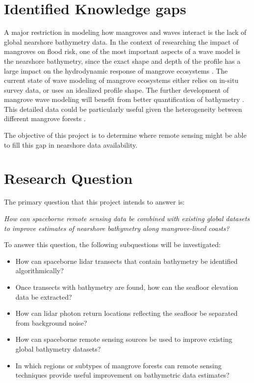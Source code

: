 \section{Identified Knowledge gaps}

A major restriction in modeling how mangroves and waves interact is the lack of global nearshore bathymetry data. In the context of researching the impact of mangroves on flood risk, one of the most important aspects of a wave model is the nearshore bathymetry, since the exact shape and depth of the profile has a large impact on the hydrodynamic response of mangrove ecosystems \parencite{Horstman2014,Maza2019}. The current state of wave modeling of mangrove ecosystems either relies on in-situ survey data, or uses an idealized profile shape. The further development of mangrove wave modeling will benefit from better quantification of bathymetry \parencite{Menendez2020,GijonMancheno2021}. This detailed data could be particularly useful given the heterogeneity between different mangrove forests \parencite{Mazda2013}.

The objective of this project is to determine where remote sensing might be able to fill this gap in nearshore data availability.

\section{Research Question}
The primary question that this project intends to answer is:

\emph{How can spaceborne remote sensing data be combined with existing global datasets to improve estimates of nearshore bathymetry along mangrove-lined coasts?}

To answer this question, the following subquestions will be investigated:

\begin{itemize}
      \item How can spaceborne lidar transects that contain bathymetry be identified algorithmically?
      \item Once transects with bathymetry are found, how can the seafloor elevation data be extracted?
      \item How can lidar photon return locations reflecting the seafloor be separated from background noise?
      \item How can spaceborne remote sensing sources be used to improve existing global bathymetry datasets?
      \item In which regions or subtypes of mangrove forests can remote sensing techniques provide useful improvement on bathymetric data estimates?
\end{itemize}
